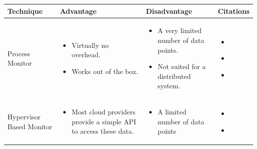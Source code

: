 \begin{longtable}{| p{23mm} | p{42mm} | p{42mm} | p{42mm} |}
\hline
    \textbf{Technique} &
    \textbf{Advantage} &
    \textbf{Disadvantage} &
    \textbf{Citations} \\ \hline

    Process Monitor &
    \vspace{-8mm}
    \begin{itemize}[leftmargin=0mm,noitemsep,nolistsep,label={}] 
        \item Virtually no overhead.
        \item Works out of the box.
        \vspace{-7mm}
    \end{itemize} &
    \vspace{-8mm}
    \begin{itemize}[leftmargin=0mm,noitemsep,nolistsep,label={}] 
        \item A very limited number of data points.
        \item     Not suited for a distributed system.
        \vspace{-7mm}
    \end{itemize} &
    \vspace{-8mm}
    \begin{itemize}[leftmargin=0mm,noitemsep,nolistsep,label={}] 
        \item \cite{chigurupati2017root}
        \item \cite{kumarage2018anomaly}
        \item \cite{kumarage2019generative}
        \vspace{-7mm}
    \end{itemize} \\ \hline

    Hypervisor Based Monitor &
    \vspace{-8mm}
    \begin{itemize}[leftmargin=0mm,noitemsep,nolistsep,label={}] 
        \item Most cloud providers provide a simple API to access these data.
        \vspace{-7mm}
    \end{itemize} &
    \vspace{-8mm}
    \begin{itemize}[leftmargin=0mm,noitemsep,nolistsep,label={}] 
        \item A limited number of data points
        \vspace{-7mm}
    \end{itemize} &
    \vspace{-8mm}
    \begin{itemize}[leftmargin=0mm,noitemsep,nolistsep,label={}] 
        \item \cite{du2018anomaly}
        \item \cite{geethika2019anomaly}
        \vspace{-7mm}
    \end{itemize} \\ \hline
    

\end{longtable}
